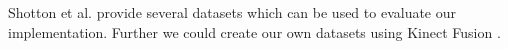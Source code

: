 Shotton et al. \cite{shotton} provide several datasets which can be used to evaluate our implementation. Further we could create our own datasets using Kinect Fusion \cite{izadi_fusion} \cite{newcombe_fusion}.



\clearpage
\renewcommand{\leftmark}{}




%





